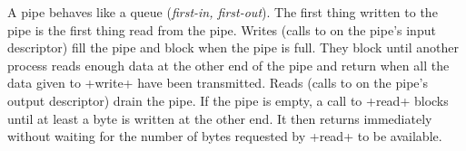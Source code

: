 

\begin{myimage}[width="60\%"]
\end{myimage}

A pipe behaves like a queue (\emph{first-in, first-out}). The first
thing written to the pipe is the first thing read from the pipe.
Writes (calls to  on the pipe's input
descriptor) fill the pipe and block when the pipe is full. They block
until another process reads enough data at the other end of the pipe
and return when all the data given to \ml+write+ have been
transmitted. Reads (calls to  on the pipe's output
descriptor) drain the pipe. If the pipe is empty, a call to \ml+read+
blocks until at least a byte is written at the other end. It then
returns immediately without waiting for the number of bytes requested
by \ml+read+ to be available.

